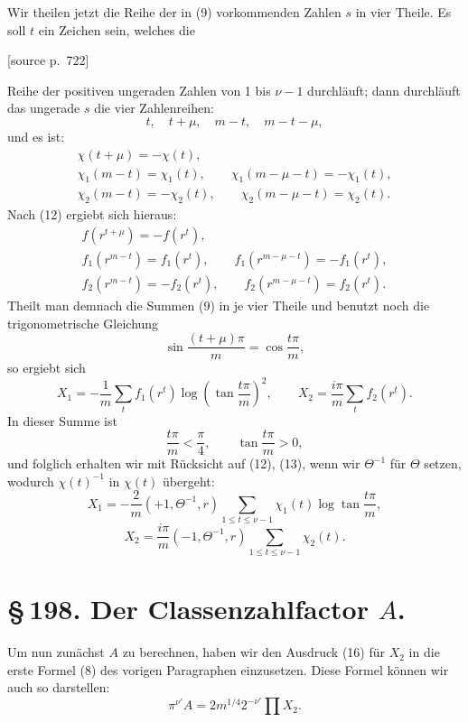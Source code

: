 \documentclass[11pt]{article}
\newcommand{\srcpage}[1]{\par\medskip\noindent\textsf{[source p.~#1]}\par\smallskip}
\begin{document}
Wir theilen jetzt die Reihe der in (9) vorkommenden Zahlen $s$ in vier Theile. Es soll $t$ ein Zeichen sein, welches die
\srcpage{722}
Reihe der positiven ungeraden Zahlen von 1 bis $\nu-1$ durchläuft; dann durchläuft das ungerade $s$ die vier Zahlenreihen:
\[
t,
\quad t+\mu,
\quad m-t,
\quad m-t-\mu,
\]
und es ist:
\[
\begin{gathered}
\chi(t+\mu)=-\chi(t),\\
\chi_1(m-t)=\chi_1(t),\qquad \chi_1(m-\mu-t)=-\chi_1(t),\\
\chi_2(m-t)=-\chi_2(t),\qquad \chi_2(m-\mu-t)=\chi_2(t).
\end{gathered}
\]
Nach (12) ergiebt sich hieraus:
\[
\begin{gathered}
f(r^{t+\mu})=-f(r^t),\\
f_1(r^{m-t})=f_1(r^t),\qquad f_1(r^{m-\mu-t})=-f_1(r^t),\\
f_2(r^{m-t})=-f_2(r^t),\qquad f_2(r^{m-\mu-t})=f_2(r^t).
\end{gathered}
\]
Theilt man demnach die Summen (9) in je vier Theile und benutzt noch die trigonometrische Gleichung
\[
\sin\frac{(t+\mu)\pi}{m}=\cos\frac{t\pi}{m},
\]
so ergiebt sich
\[
X_1=-\frac1m\sum_t f_1(r^t)\log\left(\tan\frac{t\pi}{m}\right)^2,
\qquad
X_2=\frac{i\pi}{m}\sum_t f_2(r^t).
\]
In dieser Summe ist
\[
\frac{t\pi}{m}<\frac\pi4,
\qquad
\tan\frac{t\pi}{m}>0,
\]
und folglich erhalten wir mit Rücksicht auf (12), (13), wenn wir $\Theta^{-1}$ für $\Theta$ setzen, wodurch $\chi(t)^{-1}$ in $\chi(t)$ übergeht:
\begin{equation}
X_1=-\frac2m(+1,\Theta^{-1},r)
\sum_{1\le t\le\nu-1}\chi_1(t)\log\tan\frac{t\pi}{m},
\tag{15}
\end{equation}
\begin{equation}
X_2=\frac{i\pi}{m}(-1,\Theta^{-1},r)
\sum_{1\le t\le\nu-1}\chi_2(t).
\tag{16}
\end{equation}

\section*{\S\,198. Der Classenzahlfactor $A$.}

Um nun zunächst $A$ zu berechnen, haben wir den Ausdruck (16) für $X_2$ in die erste Formel (8) des vorigen Paragraphen einzusetzen. Diese Formel können wir auch so darstellen:
\begin{equation}
\pi^{\nu'}A=2m^{1/4}2^{-\nu'}\prod X_2.
\tag{1}
\end{equation}
\end{document}

